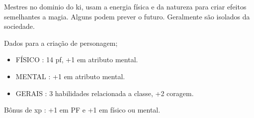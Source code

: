Mestres no dominio do ki, usam a energia física e da natureza para criar efeitos semelhantes a magia. Alguns podem prever o futuro. Geralmente são isolados da sociedade.
 

Dados para a criação de personagem;

\begin{itemize}


	\item FÍSICO : 14 pf, +1 em atributo mental.

	\item MENTAL : +1 em atributo mental.

	\item GERAIS : 3 habilidades relacionada a classe, +2 coragem.

\end{itemize}

Bônus de xp : +1 em PF e +1 em físico ou mental.

